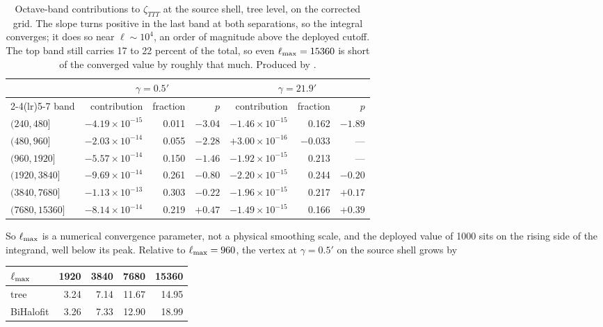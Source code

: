 \begin{table}[h]
\centering
\begin{tabular}{lrrrrrr}
\toprule
& \multicolumn{3}{c}{$\gamma=0.5'$} & \multicolumn{3}{c}{$\gamma=21.9'$} \\
\cmidrule(lr){2-4}\cmidrule(lr){5-7}
band & contribution & fraction & $p$ & contribution & fraction & $p$ \\
\midrule
$(240,480]$    & $-4.19\times10^{-15}$ & 0.011 & $-3.04$ & $-1.46\times10^{-15}$ & 0.162 & $-1.89$ \\
$(480,960]$    & $-2.03\times10^{-14}$ & 0.055 & $-2.28$ & $+3.00\times10^{-16}$ & $-0.033$ & --- \\
$(960,1920]$   & $-5.57\times10^{-14}$ & 0.150 & $-1.46$ & $-1.92\times10^{-15}$ & 0.213 & --- \\
$(1920,3840]$  & $-9.69\times10^{-14}$ & 0.261 & $-0.80$ & $-2.20\times10^{-15}$ & 0.244 & $-0.20$ \\
$(3840,7680]$  & $-1.13\times10^{-13}$ & 0.303 & $-0.22$ & $-1.96\times10^{-15}$ & 0.217 & $+0.17$ \\
$(7680,15360]$ & $-8.14\times10^{-14}$ & 0.219 & $+0.47$ & $-1.49\times10^{-15}$ & 0.166 & $+0.39$ \\
\bottomrule
\end{tabular}
\caption{Octave-band contributions to $\zeta_{TTT}$ at the source shell,
tree level, on the corrected grid. The slope turns positive in the last
band at both separations, so the integral converges; it does so near
$\ell\sim10^4$, an order of magnitude above the deployed cutoff. The top
band still carries 17 to 22 percent of the total, so even $\ell_{\max}=15360$
is short of the converged value by roughly that much. Produced by
.}
\label{tab:bands}
\end{table}

So $\ell_{\max}$ is a numerical convergence parameter, not a physical smoothing
scale, and the deployed value of 1000 sits on the rising side of the
integrand, well below its peak. Relative to $\ell_{\max}=960$, the vertex at
$\gamma=0.5'$ on the source shell grows by

\begin{center}
\begin{tabular}{lrrrr}
\toprule
$\ell_{\max}$ & 1920 & 3840 & 7680 & 15360 \\
\midrule
tree      & 3.24 & 7.14 & 11.67 & 14.95 \\
BiHalofit & 3.26 & 7.33 & 12.90 & 18.99 \\
\bottomrule
\end{tabular}
\end{center}


